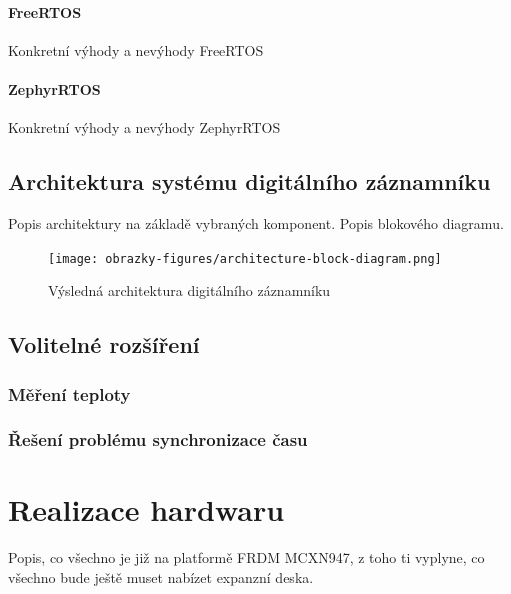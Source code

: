 \subsubsection{FreeRTOS}
Konkretní výhody a nevýhody FreeRTOS

\subsubsection{ZephyrRTOS}
Konkretní výhody a nevýhody ZephyrRTOS


\section{Architektura systému digitálního záznamníku}
Popis architektury na základě vybraných komponent. Popis blokového diagramu.

\begin{figure}[h]
    \centering
    \texttt{[image: obrazky-figures/architecture-block-diagram.png]}
    
    \caption{Výsledná architektura digitálního záznamníku}
    \label{fig:low-power-modes}
\end{figure}


\section{Volitelné rozšíření}
\subsection{Měření teploty}


\subsection{Řešení problému synchronizace času}


\chapter{Realizace hardwaru}
\label{realizace_hardwaru}
Popis, co všechno je již na platformě FRDM MCXN947, z toho ti vyplyne, co všechno bude ještě muset nabízet expanzní deska.
